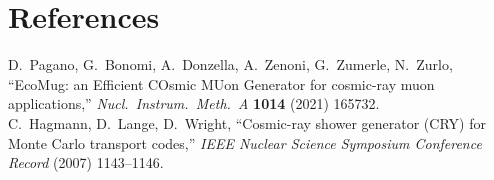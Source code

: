\section{References}
D.~Pagano, G.~Bonomi, A.~Donzella, A.~Zenoni, G.~Zumerle, N.~Zurlo, ``EcoMug: an Efficient COsmic MUon Generator for cosmic-ray muon applications,'' \emph{Nucl.\ Instrum.\ Meth.\ A} \textbf{1014} (2021) 165732.\\
C.~Hagmann, D.~Lange, D.~Wright, ``Cosmic-ray shower generator (CRY) for Monte Carlo transport codes,'' \emph{IEEE Nuclear Science Symposium Conference Record} (2007) 1143--1146.
